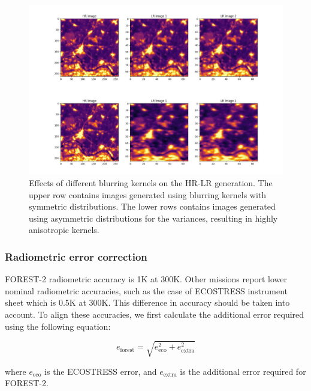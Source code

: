         \begin{figure}[H]
                \centering
                \includegraphics[width=\linewidth]{Includes/4-degradation-kernel-examples.pdf}
                \caption{Effects of different blurring kernels on the HR-LR generation. The upper row contains images generated using blurring kernels with symmetric distributions. The lower rows contains images generated using asymmetric distributions for the variances, resulting in highly anisotropic kernels.}
                \label{fig:4-degradation-kernel-examples}
            \end{figure}
            
        \subsubsection{Radiometric error correction}

        FOREST-2 radiometric accuracy is 1K at 300K.
        Other missions report lower nominal radiometric accuracies, such as the case of ECOSTRESS instrument sheet \cite{ECOSTRESS2023INSTRUMENT} which is 0.5K at 300K.
        This difference in accuracy should be taken into account. To align these accuracies, we first calculate the additional error required using the following equation:

        \begin{equation}
            e_{\text{forest}} = \sqrt{e_{\text{eco}}^2 + e_{\text{extra}}^2} 
            \label{eq:4-radiometric-error-correction}
        \end{equation}
        
        where $e_{\text{eco}}$ is the ECOSTRESS error, and $ e_{\text{extra}}$ is the additional error required for FOREST-2.
        
